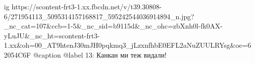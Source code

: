  
 
 
 
 

\ifcmt
  ig https://scontent-frt3-1.xx.fbcdn.net/v/t39.30808-6/271954113_5095314157168817_595242544036914894_n.jpg?_nc_cat=107&ccb=1-5&_nc_sid=b9115d&_nc_ohc=zbXnh0l-fk0AX-yLuJU&_nc_ht=scontent-frt3-1.xx&oh=00_AT9htenJ30mJH0pqkmq3_jLzxnfhbE0EFL2aNuZUULRYsg&oe=62054C6F
  @caption @label 13: Канкан ми теж видали!
\fi

